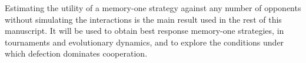 \documentclass[10pt]{article}
\newcommand{\R}{\mathbb{R}}
\newtheorem{lemma}[theorem]{Lemma}
\begin{document}
Estimating the utility of a memory-one strategy against any number of opponents
without simulating the interactions is the main result used in the rest of this manuscript.
It will be used to obtain best response memory-one strategies, in tournaments
and evolutionary dynamics, and to explore the conditions under which defection
dominates cooperation.









\end{document}
